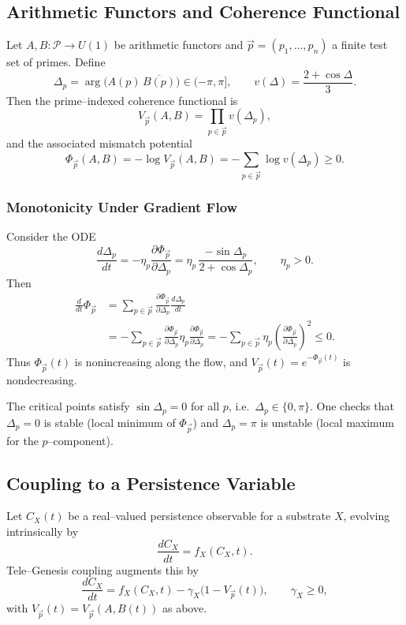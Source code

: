 \documentclass[11pt]{article}
\begin{document}
\subsection{Arithmetic Functors and Coherence Functional}

Let $A,B:\mathcal{P}\to U(1)$ be arithmetic functors and $\vec p=(p_1,\dots,p_n)$ a finite test set of primes. Define
\[
  \Delta_p = \arg\bigl(A(p)\,\overline{B(p)}\bigr) \in (-\pi,\pi], \qquad
  v(\Delta) = \frac{2+\cos\Delta}{3}.
\]
Then the prime–indexed coherence functional is
\[
  V_{\vec p}(A,B) = \prod_{p\in\vec p} v(\Delta_p),
\]
and the associated mismatch potential
\[
  \Phi_{\vec p}(A,B)
  = -\log V_{\vec p}(A,B)
  = -\sum_{p\in\vec p} \log v(\Delta_p) \ge 0.
\]

\subsubsection{Monotonicity Under Gradient Flow}

Consider the ODE
\[
  \frac{d\Delta_p}{dt}
  = -\eta_p \frac{\partial \Phi_{\vec p}}{\partial \Delta_p}
  = \eta_p\,\frac{-\sin\Delta_p}{2+\cos\Delta_p},
  \qquad \eta_p>0.
\]
Then
\begin{align*}
  \frac{d}{dt}\Phi_{\vec p}
  &= \sum_{p\in\vec p}
     \frac{\partial\Phi_{\vec p}}{\partial\Delta_p}
     \frac{d\Delta_p}{dt} \\
  &= -\sum_{p\in\vec p}
        \frac{\partial\Phi_{\vec p}}{\partial\Delta_p}
        \eta_p \frac{\partial\Phi_{\vec p}}{\partial\Delta_p}
   = -\sum_{p\in\vec p} \eta_p
        \left(\frac{\partial\Phi_{\vec p}}{\partial\Delta_p}\right)^2
  \le 0.
\end{align*}
Thus $\Phi_{\vec p}(t)$ is nonincreasing along the flow, and $V_{\vec p}(t)=e^{-\Phi_{\vec p}(t)}$ is nondecreasing.

The critical points satisfy $\sin\Delta_p=0$ for all $p$, i.e.\ $\Delta_p\in\{0,\pi\}$. One checks that $\Delta_p=0$ is stable (local minimum of $\Phi_{\vec p}$) and $\Delta_p=\pi$ is unstable (local maximum for the $p$–component).

\subsection{Coupling to a Persistence Variable}

Let $C_X(t)$ be a real–valued persistence observable for a substrate $X$, evolving intrinsically by
\[
  \frac{dC_X}{dt} = f_X(C_X,t).
\]
Tele–Genesis coupling augments this by
\[
  \frac{dC_X}{dt}
  = f_X(C_X,t) - \gamma_X\bigl(1 - V_{\vec p}(t)\bigr),
  \qquad \gamma_X\ge 0,
\]
with $V_{\vec p}(t)=V_{\vec p}(A,B(t))$ as above.
\end{document}
